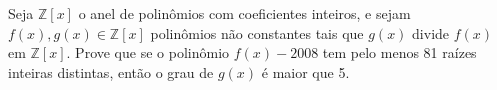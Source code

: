Seja \( \mathbb{Z}[x]\) o anel de polinômios com coeficientes inteiros, e sejam \( f(x), g(x) \in\mathbb{Z}[x]\) polinômios não constantes tais que \( g(x)\) divide \( f(x)\) em \( \mathbb{Z}[x]\). Prove que se o polinômio \( f(x)-2008\) tem pelo menos 81 raízes inteiras distintas, então o grau de \( g(x)\) é maior que 5.
